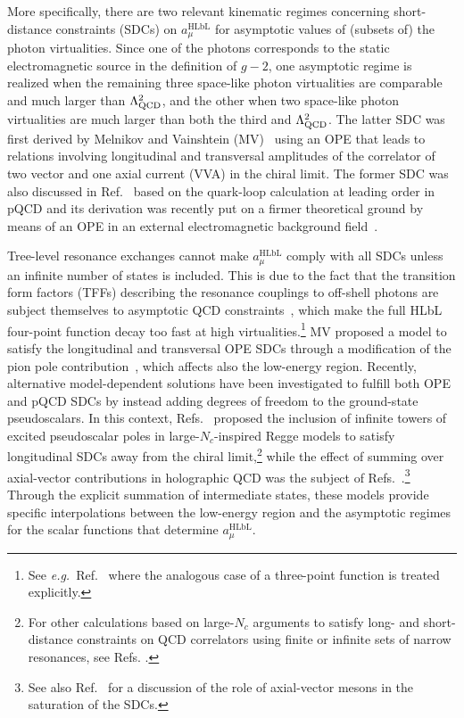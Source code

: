 More specifically, there are two relevant kinematic regimes concerning short-distance constraints (SDCs) on $a_\mu^{\text{HLbL}}$ for asymptotic values of (subsets of) the photon virtualities.
Since one of the photons corresponds to the static electromagnetic source in the definition of $g-2$, one asymptotic regime is realized when the remaining three space-like photon virtualities are comparable and much larger than $\Lambda_\text{QCD}^2$, and the other when two space-like photon virtualities are much larger than both the third and $\Lambda_\text{QCD}^2$. The latter SDC was first derived by Melnikov and Vainshtein (MV)~\cite{MV} using an OPE that leads to relations involving longitudinal and transversal amplitudes of the correlator of two vector and one axial current (VVA) in the chiral limit. The former SDC was also discussed in Ref.~\cite{MV} based on the quark-loop calculation at leading order in pQCD and its derivation was recently put on a firmer theoretical ground by means of an OPE in an external electromagnetic background field~\cite{Bijnens}.

Tree-level resonance exchanges cannot make $a_\mu^{\text{HLbL}}$ comply with all SDCs unless an infinite number of states is included. This is due to the fact that the transition form factors (TFFs) describing the resonance couplings to off-shell photons are subject themselves to asymptotic QCD constraints~\cite{Lepage:1980fj,Brodsky:1981rp,Hoferichter:2020lap},
which make the full HLbL four-point function decay too fast at high virtualities.\footnote{See {\it e.g.}\ Ref.~\cite{Bijnens:2003rc} where the analogous case of a three-point function is treated explicitly.} MV proposed a model to satisfy the longitudinal and transversal OPE SDCs through a modification of the pion pole contribution~\cite{MV, MVNew}, which affects also the low-energy region. Recently, alternative model-dependent solutions have been investigated to fulfill both OPE and pQCD SDCs by instead adding degrees of freedom to the ground-state pseudoscalars. In this context, Refs.~\cite{BernSDCShort,BernSDCLong} proposed the inclusion of infinite towers of excited pseudoscalar poles in large-$N_c$-inspired Regge models to satisfy longitudinal SDCs away from the chiral limit,\footnote{For other calculations based on large-$N_c$ arguments to satisfy long- and short-distance constraints on QCD correlators using finite or infinite sets of narrow resonances, see Refs. \cite{Peris:1998nj, Knecht:1998sp, Bijnens:2003rc, Golterman:2001nk, Knecht:2001xc, Golterman:2001pj, DAmbrosio:2019xph}.} while the effect of summing over axial-vector contributions in holographic QCD was the subject of   Refs.~\cite{HolographyVienna, HolographyItaly}.\footnote{See also Ref.~\cite{Masjuan:2020jsf} for a discussion of the role of axial-vector mesons in the saturation of the SDCs.} Through the explicit summation of intermediate states, these models provide specific interpolations between the low-energy region and the asymptotic regimes for the scalar functions that determine $a_\mu^{\text{HLbL}}$.

